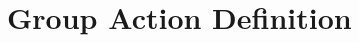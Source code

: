 \documentclass[
	aspectratio=169, %
	t, %
	onlytextwidth, %
	10pt, %
]{beamer}
\begin{document}






\section{Group Action Definition}
\end{document}
